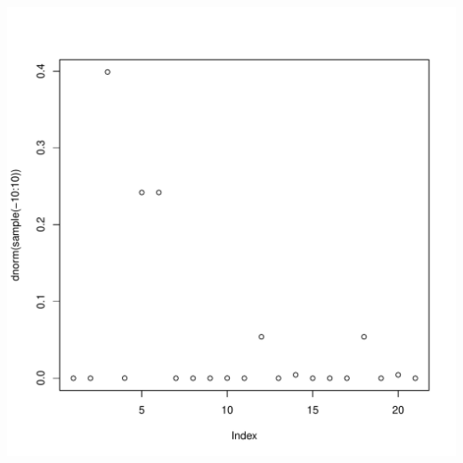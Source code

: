 \documentclass{article}\usepackage[]{graphicx}\usepackage[]{color}
\makeatletter
\def\maxwidth{ %
  \ifdim\Gin@nat@width>\linewidth
    \linewidth
  \else
    \Gin@nat@width
  \fi
}
\newenvironment{knitrout}{}{} %
\makeatother
\begin{document}
\begin{knitrout}
\includegraphics[width=\maxwidth]{figure/unnamed-chunk-23} 

\end{knitrout}
\end{document}
